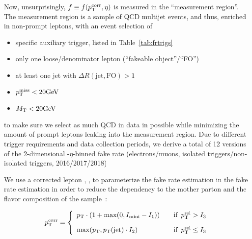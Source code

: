 Now, unsurprisingly, $f \equiv f(p_{\mathrm{T}}^\text{corr},\eta)$ is measured in the ``measurement region''.
The measurement region is a sample of QCD multijet events, and thus, 
enriched in non-prompt leptons, with an event selection of
\begin{itemize}
\item specific auxiliary trigger, listed in Table~\ref{tab:frtrigs}
\item only one loose/denominator lepton (``fakeable object''/``FO'')
\item at least one jet with $\Delta R(\mathrm{jet},\mathrm{FO})>1$
\item $p_{\mathrm{T}}^\text{miss}<20\text{GeV}$
\item $M_{\mathrm{T}}<20\text{GeV}$
\end{itemize}
to make sure we select as much QCD in data in possible while minimizing
the amount of prompt leptons leaking into the measurement region.
Due to different trigger requirements and data collection periods, we derive
a total of 12 versions of the 2-dimensional \pt-$\eta$-binned fake rate
(electrons/muons, isolated triggers/non-isolated triggers, 2016/2017/2018)

We use a corrected lepton \pt, \ptcorr, to parameterize the fake rate
estimation in the fake rate estimation in order to reduce the dependency to
the mother parton \pt and the flavor composition of the
sample~\cite{CMS:AN14261}:

\begin{equation}
  p_{\mathrm{T}}^\text{corr} = \left\{
        \begin{array}{ll}
            p_{\mathrm{T}} \cdot (1+\max(0,I_\mathrm{mini}-I_1)) & \quad \text{if} \,\,\, p_{\mathrm{T}}^\text{rel} > I_3 \\[10pt]
            \max(p_{\mathrm{T}},p_{\mathrm{T}}(\mathrm{jet}) \cdot I_2) & \quad \text{if} \,\,\, p_{\mathrm{T}}^\text{rel} \leq I_3
        \end{array}
      \right.
\end{equation}


